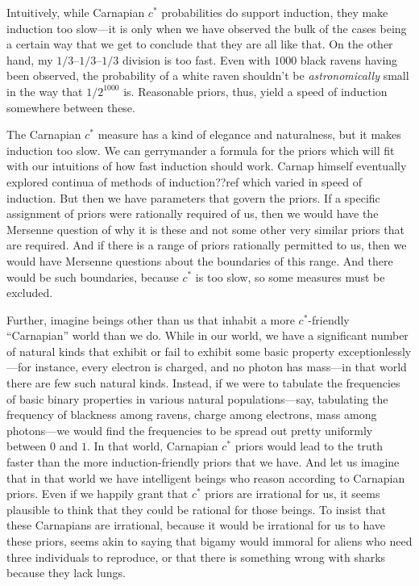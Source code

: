 Intuitively, while Carnapian $c^*$ probabilities do support induction, they make induction too slow---it is only when we have observed the bulk of the cases
being a certain way that we get to conclude that they are all like that. On the other hand, my $1/3$--$1/3$--$1/3$ division is too fast. Even with
$1000$ black ravens having been observed, the probability of a white raven shouldn't be \textit{astronomically} small in the way
that $1/2^{1000}$ is. Reasonable priors, thus, yield a speed of induction somewhere between these. 

The Carnapian $c^*$ measure has a kind of elegance and naturalness, but it makes induction too slow.
We can gerrymander a formula for the priors which will fit with our intuitions of how fast induction should work.
Carnap himself eventually explored continua of methods of induction??ref which varied in speed of induction.
But then we have parameters that govern the priors. If a specific assignment of priors were rationally
required of us, then we would have the Mersenne question of why it is these and not some other very similar priors that are required. And if there is a range of priors rationally permitted to us, then we would have Mersenne questions about the boundaries of
this range. And there would be such boundaries, because $c^*$ is too slow, so some measures must be excluded.

Further, imagine beings other than us that inhabit a more $c^*$-friendly ``Carnapian'' world than we do. While in our world, we have a significant number of natural kinds
that exhibit or fail to exhibit some basic property exceptionlessly---for instance, every electron is charged, and no photon 
has mass---in that world there are few such natural kinds. Instead, if we were to tabulate the frequencies of basic binary properties
in various natural populations---say, tabulating the frequency of blackness among ravens, charge among electrons, mass among photons---we 
would find the frequencies to be spread out pretty uniformly between $0$ and $1$. In that world, Carnapian $c^*$ priors would lead to the truth faster
than the more induction-friendly priors that we have. And let us imagine that in that world we have intelligent beings who reason according
to Carnapian priors. Even if we happily grant that $c^*$ priors are irrational for us, it seems plausible to think that they could be
rational for those beings. To insist that these Carnapians are irrational, because it would be irrational for us to have these priors,
seems akin to saying that bigamy would immoral for aliens who need three individuals to reproduce, or that there is something wrong with sharks
because they lack lungs. 


